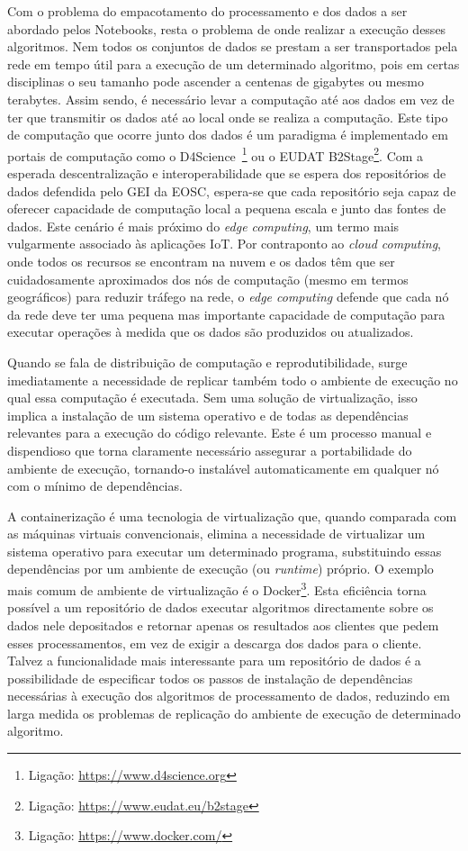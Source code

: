 \documentclass[sigconf,nonacm]{acmart}
\begin{document}
Com o problema do empacotamento do processamento e dos dados a ser abordado pelos Notebooks, resta o problema de onde realizar a execução desses algoritmos. Nem todos os conjuntos de dados se prestam a ser transportados pela rede em tempo útil para a execução de um determinado algoritmo, pois em certas disciplinas o seu tamanho pode ascender a centenas de gigabytes ou mesmo terabytes. Assim sendo, é necessário levar a computação até aos dados em vez de ter que transmitir os dados até ao local onde se realiza a computação. Este tipo de computação que ocorre junto dos dados é um paradigma é implementado em portais de computação como o D4Science~\footnote{Ligação: \url{https://www.d4science.org}} ou o EUDAT B2Stage\footnote{Ligação: \url{https://www.eudat.eu/b2stage}}. Com a esperada descentralização e interoperabilidade que se espera dos repositórios de dados defendida pelo GEI da EOSC, espera-se que cada repositório seja capaz de oferecer capacidade de computação local a pequena escala e junto das fontes de dados. Este cenário é mais próximo do \emph{edge computing}, um termo mais vulgarmente associado às aplicações IoT. Por contraponto ao \emph{cloud computing}, onde todos os recursos se encontram na nuvem e os dados têm que ser cuidadosamente aproximados dos nós de computação (mesmo em termos geográficos) para reduzir tráfego na rede, o \emph{edge computing} defende que cada nó da rede deve ter uma pequena mas importante capacidade de computação para executar operações à medida que os dados são produzidos ou atualizados. 

Quando se fala de distribuição de computação e reprodutibilidade, surge imediatamente a necessidade de replicar também todo o ambiente de execução no qual essa computação é executada. Sem uma solução de virtualização, isso implica a instalação de um sistema operativo e de todas as dependências relevantes para a execução do código relevante. Este é um processo manual e dispendioso que torna claramente necessário assegurar a portabilidade do ambiente de execução, tornando-o instalável automaticamente em qualquer nó com o mínimo de dependências. 

A containerização é uma tecnologia de virtualização que, quando comparada com as máquinas virtuais convencionais, elimina a necessidade de virtualizar um sistema operativo para executar um determinado programa, substituindo essas dependências por um ambiente de execução (ou \textit{runtime}) próprio. O exemplo mais comum de ambiente de virtualização é o Docker\footnote{Ligação: \url{https://www.docker.com/}}. Esta eficiência torna possível a um repositório de dados executar algoritmos directamente sobre os dados nele depositados e retornar apenas os resultados aos clientes que pedem esses processamentos, em vez de exigir a descarga dos dados para o cliente. Talvez a funcionalidade mais interessante para um repositório de dados é a possibilidade de especificar todos os passos de instalação de dependências necessárias à execução dos algoritmos de processamento de dados, reduzindo em larga medida os problemas de replicação do ambiente de execução de determinado algoritmo.
\end{document}
